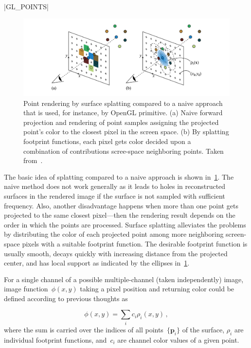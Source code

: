 |GL_POINTS|
\begin{figure}
    \centering
    \includegraphics[width=.9\textwidth]{../graphics/splatting_principle.png}
    \caption[Surface splatting compared to simple projection]{Point rendering
    by surface splatting compared to a naive approach that is used, for instance,
    by \protect{} OpenGL primitive. (a) Naive forward projection and rendering of point samples
    assigning the projected point's color to the closest pixel in the screen space. (b) By splatting footprint
    functions, each pixel gets color decided upon a combination of contributions scree-space neighboring points.
    Taken from~\citet{PointRendering}.}\label{fig:splatting_principle}
\end{figure}

The basic idea of splatting compared to a naive approach is shown in~\cref{fig:splatting_principle}.
The naive method does not work generally as it leads to holes in reconstructed surfaces in the rendered image
if the surface is not sampled with sufficient frequency. Also, another disadvantage happens when more than
one point gets projected to the same closest pixel---then the rendering result depends on the order in
which the points are processed. Surface splatting alleviates the problems by distributing the color of
each projected point among more neighboring screen-space pixels with a suitable footprint function.
The desirable footprint function is usually smooth, decays quickly with increasing
distance from the projected center, and has local support as indicated by the ellipses in~\cref{fig:splatting_principle}.

For a single channel of a possible multiple-channel (taken independently) image, image function~$\phi(x, y)$
taking a pixel position and returning color could be defined according to previous thoughts as

\begin{equation}\label{eq:simple_splatting}
\phi(x, y) = \sum_i c_i\rho_i(x, y)\,,
\end{equation}
where the sum is carried over the indices of all points~$\{\mathbf{p}_i\}$ of the surface, $\rho_i$ are individual
footprint functions, and~$c_i$ are channel color values of a given point.


